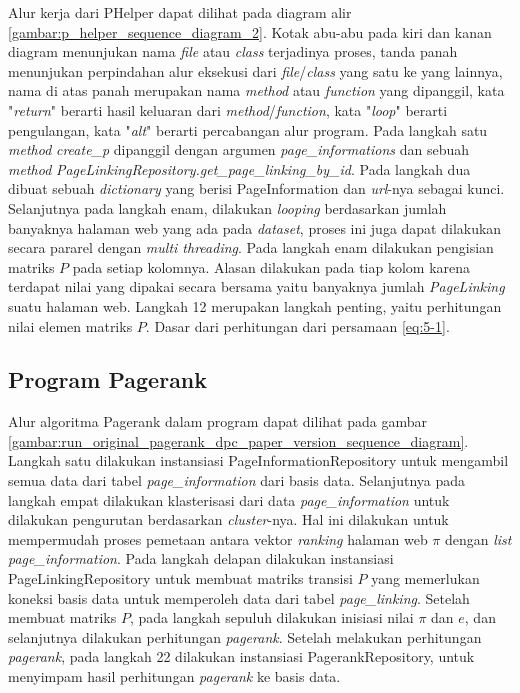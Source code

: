 Alur kerja dari PHelper dapat dilihat pada diagram alir \ref{gambar:p_helper_sequence_diagram_2}. Kotak abu-abu pada kiri dan kanan diagram menunjukan nama \textit{file} atau \textit{class} terjadinya proses, tanda panah menunjukan perpindahan alur eksekusi dari \textit{file}/\textit{class} yang satu ke yang lainnya, nama di atas panah merupakan nama \textit{method} atau \textit{function} yang dipanggil, kata "\textit{return}" berarti hasil keluaran dari \textit{method}/\textit{function}, kata "\textit{loop}" berarti pengulangan, kata "\textit{alt}" berarti percabangan alur program. Pada langkah satu \textit{method} \textit{create\_p} dipanggil dengan argumen \textit{page\_informations} dan sebuah \textit{method} \textit{PageLinkingRepository.get\_page\_linking\_by\_id}. Pada langkah dua dibuat sebuah \textit{dictionary} yang berisi PageInformation dan \textit{url}-nya sebagai kunci. Selanjutnya pada langkah enam, dilakukan \textit{looping} berdasarkan jumlah banyaknya halaman web yang ada pada \textit{dataset}, proses ini juga dapat dilakukan secara pararel dengan \textit{multi threading}. Pada langkah enam dilakukan pengisian matriks $P$ pada setiap kolomnya. Alasan dilakukan pada tiap kolom karena terdapat nilai yang dipakai secara bersama yaitu banyaknya jumlah \textit{PageLinking} suatu halaman web. Langkah 12 merupakan langkah penting, yaitu perhitungan nilai elemen matriks $P$. Dasar dari perhitungan dari persamaan \ref{eq:5-1}.

\subsection{Program Pagerank}

Alur algoritma Pagerank dalam program dapat dilihat pada gambar \ref{gambar:run_original_pagerank_dpc_paper_version_sequence_diagram}. Langkah satu dilakukan instansiasi PageInformationRepository untuk mengambil semua data dari tabel \textit{page\_information} dari basis data. Selanjutnya pada langkah empat dilakukan klasterisasi dari data \textit{page\_information} untuk dilakukan pengurutan berdasarkan \textit{cluster}-nya. Hal ini dilakukan untuk mempermudah proses pemetaan antara vektor \textit{ranking} halaman web $\pi$ dengan \textit{list} \textit{page\_information}. Pada langkah delapan dilakukan instansiasi PageLinkingRepository untuk membuat matriks transisi $P$ yang memerlukan koneksi basis data untuk memperoleh data dari tabel \textit{page\_linking}. Setelah membuat matriks $P$, pada langkah sepuluh dilakukan inisiasi nilai $\pi$ dan $e$, dan selanjutnya dilakukan perhitungan \textit{pagerank}. Setelah melakukan perhitungan \textit{pagerank}, pada langkah 22 dilakukan instansiasi PagerankRepository, untuk menyimpam hasil perhitungan \textit{pagerank} ke basis data.

